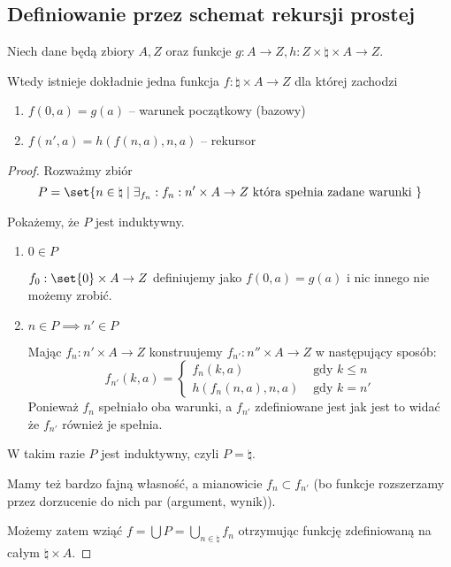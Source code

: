 \subsection{Definiowanie przez schemat rekursji prostej}

\begin{theorem}
	Niech dane będą zbiory \( A, Z \) oraz funkcje \( g: A \rightarrow Z, h : Z \times \natural \times A \rightarrow Z \).

	Wtedy istnieje dokładnie jedna funkcja \( f : \natural \times A \rightarrow Z \) dla której zachodzi
	\begin{enumerate}
		\item \( f(0, a) = g(a) \) -- warunek początkowy (bazowy)
		\item \( f(n', a) = h(f(n, a), n, a) \) -- rekursor
	\end{enumerate}
\end{theorem}
\begin{proof}
	Rozważmy zbiór
	\[
		P = \set{ n \in \natural \mid \exists_{f_n} : f_n : n' \times A \rightarrow Z \text{ która spełnia zadane warunki }}
	\]

	Pokażemy, że \( P \) jest induktywny.

	\begin{enumerate}
		\item \( 0 \in P \)

		      \( f_0 : \set{0} \times A \rightarrow Z \) definiujemy jako \( f(0, a) = g(a) \) i nic innego nie możemy zrobić.

		\item \( n \in P \implies n' \in P \)

		      Mając \( f_n : n' \times A \rightarrow Z \) konstruujemy \( f_{n'} : n'' \times A \rightarrow Z \) w następujący sposób:
		      \[
			      f_{n'}(k, a) = \begin{cases}
				      f_n(k, a)          & \text{ gdy } k \leq n \\
				      h(f_n(n, a), n, a) & \text{ gdy } k = n'
			      \end{cases}
		      \]
		      Ponieważ \( f_n \) spełniało oba warunki, a \( f_{n'} \) zdefiniowane jest jak jest to widać że \( f_{n'} \) również je spełnia.
	\end{enumerate}

	W takim razie \( P \) jest induktywny, czyli \( P = \natural \).

	Mamy też bardzo fajną własność, a mianowicie \( f_n \subset f_{n'} \) (bo funkcje rozszerzamy przez dorzucenie do nich par (argument, wynik)).

	Możemy zatem wziąć \( f = \bigcup P = \bigcup_{n \in \natural} f_n \) otrzymując funkcję zdefiniowaną na całym \( \natural \times A \).
\end{proof}
